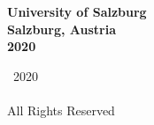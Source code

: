 

\thispagestyle{empty}

\begingroup
\centering
{}
~
\\[1em]
\sffamily\bfseries\fontsize{26}{31.2}\selectfont
\DocumentTitle
\\[0.4in]
\normalfont\large
\sffamily\bfseries\Large
\AuthorName
\vfill
University of Salzburg
\\[0.5em]
Salzburg, Austria
\\[1.5em]
2020
\par
\endgroup

\clearpage


\pagestyle{plain}
\setcounter{page}{2}

\begingroup
\centering
{}
\null
\vfill
{\sffamily\textcopyright}~2020
\\[0.5em]
\AuthorName
\\[0.5em]
All Rights Reserved
\par
\endgroup

\clearpage


%

